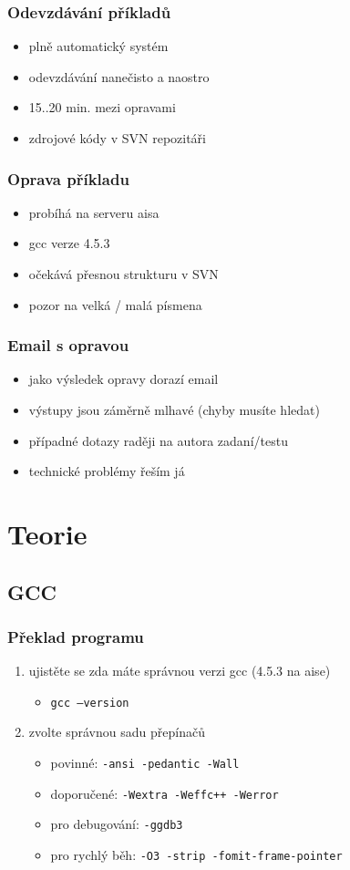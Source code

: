 \begin{frame}
	\frametitle{Odevzdávání příkladů}
	\begin{itemize}
		\item{plně automatický systém}
		\item{odevzdávání nanečisto a naostro}
		\item{15..20 min. mezi opravami}
		\item{zdrojové kódy v SVN repozitáři}
	\end{itemize}
\end{frame}

\begin{frame}
	\frametitle{Oprava příkladu}
	\begin{itemize}
		\item{probíhá na serveru aisa}
		\item{gcc verze 4.5.3}
		\item{očekává přesnou strukturu v SVN}
		\item{pozor na velká / malá písmena}
	\end{itemize}
\end{frame}

\begin{frame}
	\frametitle{Email s opravou}
	\begin{itemize}
		\item{jako výsledek opravy dorazí email}
		\item{výstupy jsou záměrně mlhavé (chyby musíte hledat)}
		\item{případné dotazy raději na autora zadaní/testu}
		\item{technické problémy řeším já}
	\end{itemize}
\end{frame}

\section{Teorie}
\subsection{GCC}

\begin{frame}
	\frametitle{Překlad programu}
	\begin{enumerate}
		\item{ujistěte se zda máte správnou verzi gcc (4.5.3 na aise)}
		\begin{itemize}
			\item{\texttt{gcc --version}}
		\end{itemize}
		\item{zvolte správnou sadu přepínačů}
		\begin{itemize}
			\item{\alert{povinné:} \texttt{-ansi -pedantic -Wall}}
			\item{\alert{doporučené:} \texttt{-Wextra -Weffc++ -Werror}}
			\item{pro debugování: \texttt{-ggdb3}}
			\item{pro rychlý běh: \texttt{-O3 -strip -fomit-frame-pointer}}
		\end{itemize}
	\end{enumerate}
\end{frame}

